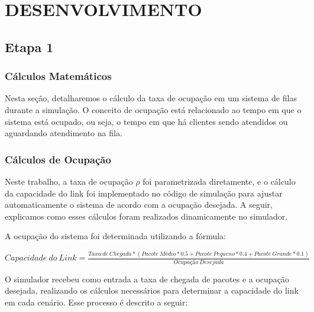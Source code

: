 \section{\large DESENVOLVIMENTO}
\subsection{Etapa 1}
\subsubsection{Cálculos Matemáticos}
Nesta seção, detalharemos o cálculo da taxa de ocupação em um sistema de filas durante a simulação. O conceito de ocupação está relacionado ao tempo em que o sistema está ocupado, ou seja, o tempo em que há clientes sendo atendidos ou aguardando atendimento na fila.
\subsubsection{Cálculos de Ocupação}

Neste trabalho, a taxa de ocupação $\rho$ foi parametrizada diretamente, e o cálculo da capacidade do link foi implementado no código de simulação para ajustar automaticamente o sistema de acordo com a ocupação desejada. A seguir, explicamos como esses cálculos foram realizados dinamicamente no simulador.

A ocupação do sistema foi determinada utilizando a fórmula:

$Capacidade\ do\ Link = \frac{Taxa\ de\ Chegada * (Pacote\ Médio*0.5+Pacote\ Pequeno*0.4 +Pacote\ Grande*0.1)}{Ocupação\ Desejada}$


O simulador recebeu como entrada a taxa de chegada de pacotes e a ocupação desejada, realizando os cálculos necessários para determinar a capacidade do link em cada cenário. Esse processo é descrito a seguir:


